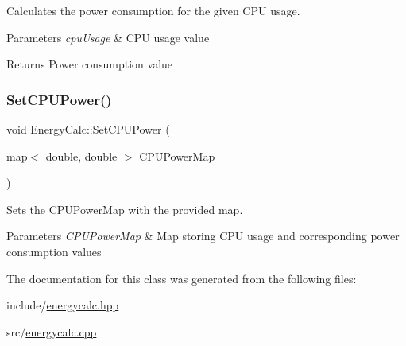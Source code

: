 Calculates the power consumption for the given C\+PU usage. 


\begin{DoxyParams}{Parameters}
{\em cpu\+Usage} & C\+PU usage value \\
\hline
\end{DoxyParams}
\begin{DoxyReturn}{Returns}
Power consumption value 
\end{DoxyReturn}
\mbox{\label{classEnergyCalc_a1b883383c88c2ce543eaf4390e9c5ae3}} 
\subsubsection{\texorpdfstring{Set\+C\+P\+U\+Power()}{SetCPUPower()}}
{\footnotesize\ttfamily void Energy\+Calc\+::\+Set\+C\+P\+U\+Power (\begin{DoxyParamCaption}\item[{map$<$ double, double $>$}]{C\+P\+U\+Power\+Map }\end{DoxyParamCaption})}



Sets the C\+P\+U\+Power\+Map with the provided map. 


\begin{DoxyParams}{Parameters}
{\em C\+P\+U\+Power\+Map} & Map storing C\+PU usage and corresponding power consumption values \\
\hline
\end{DoxyParams}


The documentation for this class was generated from the following files\+:\begin{DoxyCompactItemize}
\item 
include/\hyperlink{energycalc_8hpp}{energycalc.\+hpp}\item 
src/\hyperlink{energycalc_8cpp}{energycalc.\+cpp}\end{DoxyCompactItemize}
